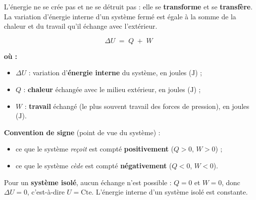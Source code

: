 \documentclass[11pt,a4paper]{article}
\newenvironment{ou}{%
  \par\smallskip\noindent\textbf{où :}\nopagebreak
  \begin{itemize}[leftmargin=1.8em,topsep=2pt,itemsep=1.5pt,parsep=0pt]}%
  {\end{itemize}}
\begin{document}
\begin{principe}
L'énergie ne se crée pas et ne se détruit pas : elle se \textbf{transforme} et se \textbf{transfère}.
La variation d'énergie interne d'un système fermé est égale à la somme de la chaleur et du travail
qu'il échange avec l'extérieur.
\end{principe}

\begin{formule}
\[ \boxed{\;\Delta U \;=\; Q \;+\; W\;} \]
\begin{ou}
  \item $\Delta U$ : variation d'\textbf{énergie interne} du système, en joules ($\si{\joule}$) ;
  \item $Q$ : \textbf{chaleur} échangée avec le milieu extérieur, en joules ($\si{\joule}$) ;
  \item $W$ : \textbf{travail} échangé (le plus souvent travail des forces de pression), en joules ($\si{\joule}$).
\end{ou}
\textbf{Convention de signe} (point de vue du système) :
\begin{itemize}[leftmargin=1.6em,topsep=2pt,itemsep=1pt]
  \item ce que le système \emph{reçoit} est compté \textbf{positivement} ($Q>0$, $W>0$) ;
  \item ce que le système \emph{cède} est compté \textbf{négativement} ($Q<0$, $W<0$).
\end{itemize}
\end{formule}

\begin{remarque}
Pour un \textbf{système isolé}, aucun échange n'est possible : $Q=0$ et $W=0$, donc $\Delta U = 0$,
c'est-à-dire $U = \text{Cte}$. L'énergie interne d'un système isolé est constante.
\end{remarque}
\end{document}

